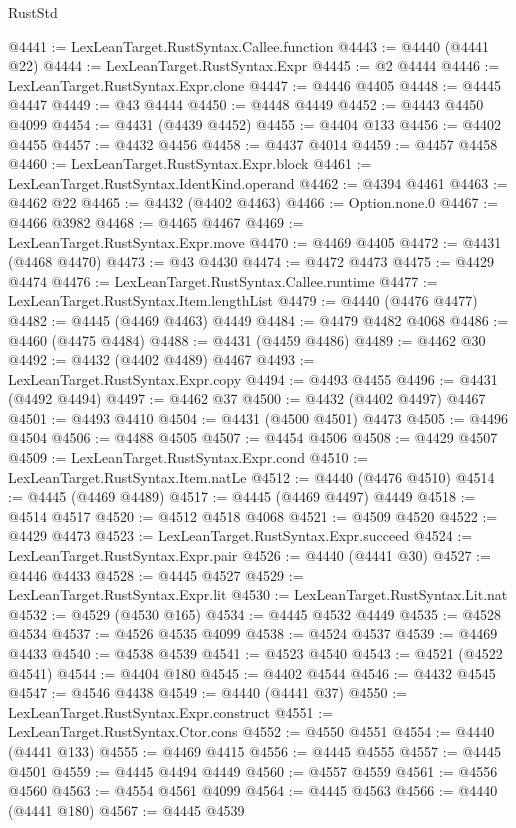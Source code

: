 \begin{lexlean}{RustStd}
\begin{coremodule}
@4441 := LexLeanTarget.RustSyntax.Callee.function
@4443 := @4440 (@4441 @22)
@4444 := LexLeanTarget.RustSyntax.Expr
@4445 := @2 @4444
@4446 := LexLeanTarget.RustSyntax.Expr.clone
@4447 := @4446 @4405
@4448 := @4445 @4447
@4449 := @43 @4444
@4450 := @4448 @4449
@4452 := @4443 @4450 @4099
@4454 := @4431 (@4439 @4452)
@4455 := @4404 @133
@4456 := @4402 @4455
@4457 := @4432 @4456
@4458 := @4437 @4014
@4459 := @4457 @4458
@4460 := LexLeanTarget.RustSyntax.Expr.block
@4461 := LexLeanTarget.RustSyntax.IdentKind.operand
@4462 := @4394 @4461
@4463 := @4462 @22
@4465 := @4432 (@4402 @4463)
@4466 := Option.none.{0}
@4467 := @4466 @3982
@4468 := @4465 @4467
@4469 := LexLeanTarget.RustSyntax.Expr.move
@4470 := @4469 @4405
@4472 := @4431 (@4468 @4470)
@4473 := @43 @4430
@4474 := @4472 @4473
@4475 := @4429 @4474
@4476 := LexLeanTarget.RustSyntax.Callee.runtime
@4477 := LexLeanTarget.RustSyntax.Item.lengthList
@4479 := @4440 (@4476 @4477)
@4482 := @4445 (@4469 @4463) @4449
@4484 := @4479 @4482 @4068
@4486 := @4460 (@4475 @4484)
@4488 := @4431 (@4459 @4486)
@4489 := @4462 @30
@4492 := @4432 (@4402 @4489) @4467
@4493 := LexLeanTarget.RustSyntax.Expr.copy
@4494 := @4493 @4455
@4496 := @4431 (@4492 @4494)
@4497 := @4462 @37
@4500 := @4432 (@4402 @4497) @4467
@4501 := @4493 @4410
@4504 := @4431 (@4500 @4501) @4473
@4505 := @4496 @4504
@4506 := @4488 @4505
@4507 := @4454 @4506
@4508 := @4429 @4507
@4509 := LexLeanTarget.RustSyntax.Expr.cond
@4510 := LexLeanTarget.RustSyntax.Item.natLe
@4512 := @4440 (@4476 @4510)
@4514 := @4445 (@4469 @4489)
@4517 := @4445 (@4469 @4497) @4449
@4518 := @4514 @4517
@4520 := @4512 @4518 @4068
@4521 := @4509 @4520
@4522 := @4429 @4473
@4523 := LexLeanTarget.RustSyntax.Expr.succeed
@4524 := LexLeanTarget.RustSyntax.Expr.pair
@4526 := @4440 (@4441 @30)
@4527 := @4446 @4433
@4528 := @4445 @4527
@4529 := LexLeanTarget.RustSyntax.Expr.lit
@4530 := LexLeanTarget.RustSyntax.Lit.nat
@4532 := @4529 (@4530 @165)
@4534 := @4445 @4532 @4449
@4535 := @4528 @4534
@4537 := @4526 @4535 @4099
@4538 := @4524 @4537
@4539 := @4469 @4433
@4540 := @4538 @4539
@4541 := @4523 @4540
@4543 := @4521 (@4522 @4541)
@4544 := @4404 @180
@4545 := @4402 @4544
@4546 := @4432 @4545
@4547 := @4546 @4438
@4549 := @4440 (@4441 @37)
@4550 := LexLeanTarget.RustSyntax.Expr.construct
@4551 := LexLeanTarget.RustSyntax.Ctor.cons
@4552 := @4550 @4551
@4554 := @4440 (@4441 @133)
@4555 := @4469 @4415
@4556 := @4445 @4555
@4557 := @4445 @4501
@4559 := @4445 @4494 @4449
@4560 := @4557 @4559
@4561 := @4556 @4560
@4563 := @4554 @4561 @4099
@4564 := @4445 @4563
@4566 := @4440 (@4441 @180)
@4567 := @4445 @4539

\end{coremodule}
\end{lexlean}
